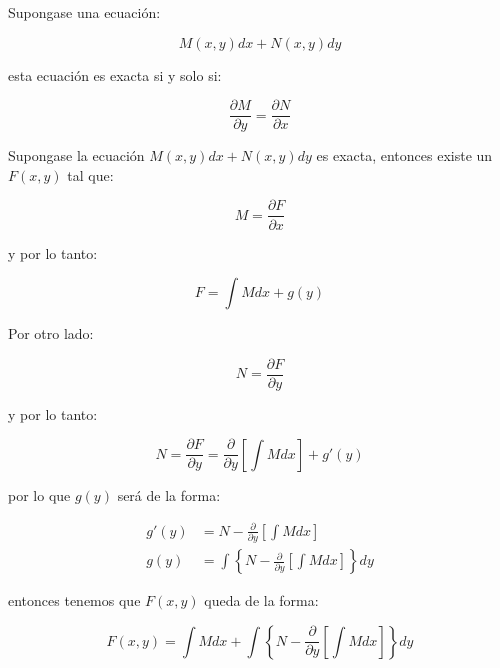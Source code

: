 		\begin{proposicion}
			Supongase una ecuación:

			\begin{equation}
				M(x, y) dx + N(x, y) dy
			\end{equation}

			esta ecuación es exacta si y solo si:

			\begin{equation}
				\frac{\partial M}{\partial y} = \frac{\partial N}{\partial x}
			\end{equation}
		\end{proposicion}

		Supongase la ecuación $M(x, y) dx + N(x, y) dy$ es exacta, entonces existe un $F(x, y)$ tal que:

			\begin{equation*}
				M = \frac{\partial F}{\partial x}
			\end{equation*}

			y por lo tanto:

			\begin{equation*}
				F = \int M dx + g(y)
			\end{equation*}

			Por otro lado:

			\begin{equation*}
				N = \frac{\partial F}{\partial y}
			\end{equation*}

			y por lo tanto:

			\begin{equation*}
				N = \frac{\partial F}{\partial y} = \frac{\partial}{\partial y} \left[ \int M dx \right] + g'(y)
			\end{equation*}

			por lo que $g(y)$ será de la forma:

			\begin{align*}
				g'(y) &= N - \frac{\partial}{\partial y} \left[ \int M dx \right] \\
				g(y) &= \int \left\{ N - \frac{\partial}{\partial y} \left[ \int M dx \right] \right\} dy
			\end{align*}

			entonces tenemos que $F(x, y)$ queda de la forma:

			\begin{equation*}
				F(x, y) = \int M dx + \int \left\{ N - \frac{\partial}{\partial y} \left[ \int M dx \right] \right\} dy
			\end{equation*}

